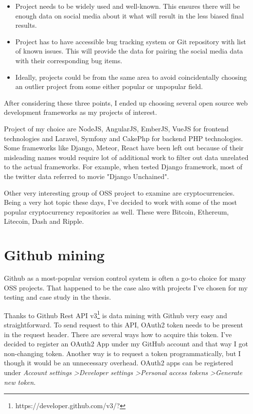 \begin{itemize}
  \item Project needs to be widely used and well-known. This ensures there will be enough data on social media about it what will result in the less biased final results.
  \item Project has to have accessible bug tracking system or Git repository with list of known issues. This will provide the data for pairing the social media data with their corresponding bug items.
  \item Ideally, projects could be from the same area to avoid coincidentally choosing an outlier project from some either popular or unpopular field.
\end{itemize}

After considering these three points, I ended up choosing several open source web development frameworks as my projects of interest. 

Project of my choice are NodeJS, AngularJS, EmberJS, VueJS for frontend technologies and Laravel, Symfony and CakePhp for backend PHP technologies. Some frameworks like Django, Meteor, React have been left out because of their misleading names  would require lot of additional work to filter out data unrelated to the actual frameworks. For example, when tested Django framework, most of the twitter data referred to movie "Django Unchained".

Other very interesting group of OSS project to examine are cryptocurrencies. Being a very hot topic these days, I've decided to work with some of the most popular cryptocurrency repositories as well. These were Bitcoin, Ethereum, Litecoin, Dash and Ripple.

\section{Github mining}
Github as a most-popular version control system is often a go-to choice for many OSS projects. That happened to be the case also with projects I've chosen for my testing and case study in the thesis.

Thanks to Github Rest API v3\footnote{https://developer.github.com/v3/?} is data mining with Github very easy and straightforward. To send request to this API, OAuth2 token needs to be present in the request header. There are several ways how to acquire this token. I've decided to register an OAuth2 App under my GitHub account and that way I got non-changing token. Another way is to request a token programmatically, but I though it would be an unnecessary overhead. OAuth2 apps can be registered under \textit{Account settings \textgreater Developer settings \textgreater Personal access tokens \textgreater Generate new token}.
